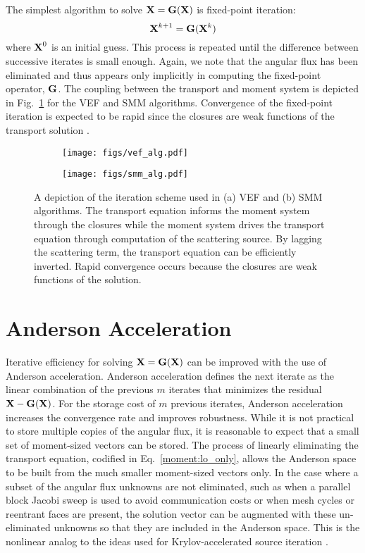 \documentclass[../doc.tex]{subfiles}
\begin{document}
The simplest algorithm to solve $\boldsymbol{\mathrm{X}} = \boldsymbol{\mathrm{G}}(\boldsymbol{\mathrm{X}})$ is fixed-point iteration: 
	\begin{equation}
		\boldsymbol{\mathrm{X}}^{k+1} = \boldsymbol{\mathrm{G}}(\boldsymbol{\mathrm{X}}^k) 
	\end{equation}
where $\boldsymbol{\mathrm{X}}^0$ is an initial guess. This process is repeated until the difference between successive iterates is small enough. Again, we note that the angular flux has been eliminated and thus appears only implicitly in computing the fixed-point operator, $\boldsymbol{\mathrm{G}}$. The coupling between the transport and moment system is depicted in Fig.~\ref{moment:moment_alg} for the VEF and SMM algorithms. Convergence of the fixed-point iteration is expected to be rapid since the closures are weak functions of the transport solution \cite{goldin}. 
\begin{figure}
\centering
\begin{subfigure}{.47\textwidth}
	\centering
	\texttt{[image: figs/vef\_alg.pdf]}	
	\caption{}
\end{subfigure}
\hfill
\begin{subfigure}{.47\textwidth}
	\centering
	\texttt{[image: figs/smm\_alg.pdf]}	
	\caption{}
\end{subfigure}
\caption{A depiction of the iteration scheme used in (a) VEF and (b) SMM algorithms. The transport equation informs the moment system through the closures while the moment system drives the transport equation through computation of the scattering source. By lagging the scattering term, the transport equation can be efficiently inverted. Rapid convergence occurs because the closures are weak functions of the solution.}
\label{moment:moment_alg}
\end{figure}

\section{Anderson Acceleration}
Iterative efficiency for solving $\boldsymbol{\mathrm{X}} = \boldsymbol{\mathrm{G}}(\boldsymbol{\mathrm{X}})$ can be improved with the use of Anderson acceleration. Anderson acceleration defines the next iterate as the linear combination of the previous $m$ iterates that minimizes the residual $\boldsymbol{\mathrm{X}} - \boldsymbol{\mathrm{G}}(\boldsymbol{\mathrm{X}})$. For the storage cost of $m$ previous iterates, Anderson acceleration increases the convergence rate and improves robustness. While it is not practical to store multiple copies of the angular flux, it is reasonable to expect that a small set of moment-sized vectors can be stored. The process of linearly eliminating the transport equation, codified in Eq.~\ref{moment:lo_only}, allows the Anderson space to be built from the much smaller moment-sized vectors only. In the case where a subset of the angular flux unknowns are not eliminated, such as when a parallel block Jacobi sweep is used to avoid communication costs or when mesh cycles or reentrant faces are present, the solution vector can be augmented with these un-eliminated unknowns so that they are included in the Anderson space. This is the nonlinear analog to the ideas used for Krylov-accelerated source iteration \cite{doi:10.13182/NSE02-14}. 
\end{document}
